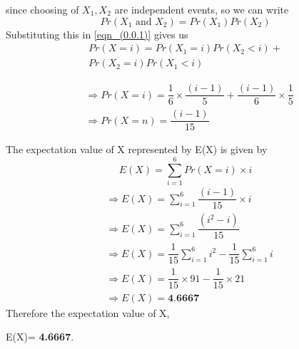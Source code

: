 \documentclass[a4paper]{article}
\begin{document}
\begin{multicols*}{2}
since choosing of $X_1,X_2$ are independent events, so we can write 
$$Pr(X_1 \text{ and }X_2)=Pr(X_1)Pr(X_2)$$
Substituting this in \eqref{eqn_(0.0.1)} gives us
\begin{multline}
Pr(X=i)=Pr(X_1=i)Pr(X_2<i)+\\
Pr(X_2=i)Pr(X_1<i)
\end{multline}

\begin{align}
& \Longrightarrow Pr(X=i)=\dfrac{1}{6}\times \dfrac{(i-1)}{5}+\dfrac{(i-1)}{6} \times\dfrac{1}{5}\\
& \Longrightarrow Pr(X=n)=\dfrac{(i-1)}{15}
\end{align}

The expectation value of X represented by E(X) is given by
$$E(X)=\sum_{i=1}^{6} Pr(X=i)\times i$$
\begin{align}
& \Longrightarrow E(X)=\sum_{i=1}^{6} \dfrac{(i-1)}{15}\times i\\
& \Longrightarrow E(X)=\sum_{i=1}^{6} \dfrac{(i^2-i)}{15}\\
& \Longrightarrow E(X)=\dfrac{1}{15} \sum_{i=1}^{6} i^2-\dfrac{1}{15}\sum_{i=1}^{6} i\\
& \Longrightarrow E(X)=\dfrac{1}{15} \times 91-\dfrac{1}{15} \times 21\\
& \Longrightarrow E(X)= \textbf{4.6667}
\end{align}
Therefore the expectation value of X, 

E(X)= \textbf{4.6667}.
\end{multicols*}
\end{document}
